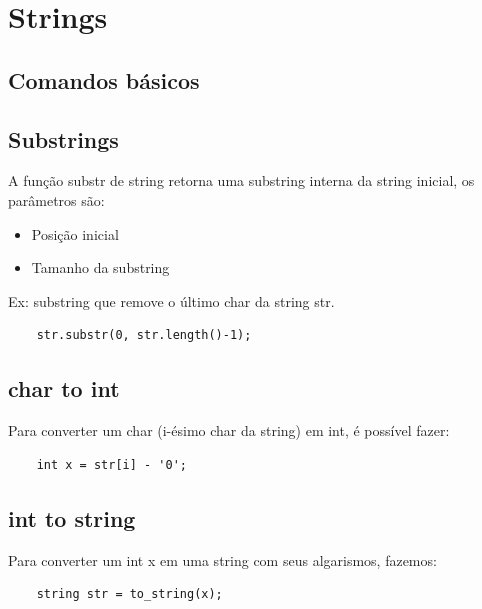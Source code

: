 \section{Strings}

\subsection{Comandos básicos}

\subsection{Substrings}

\par A função substr de string retorna uma substring interna da string inicial, os parâmetros são:
\begin{itemize}
    \item Posição inicial
    \item Tamanho da substring
\end{itemize}
\par Ex: substring que remove o último char da string str.
\begin{verbatim}
    str.substr(0, str.length()-1);
\end{verbatim}

\subsection{char to int}
\par Para converter um char (i-ésimo char da string) em int, é possível fazer:
\begin{verbatim}
    int x = str[i] - '0';
\end{verbatim}

\subsection{int to string}
\par Para converter um int x em uma string com seus algarismos, fazemos:
\begin{verbatim}
    string str = to_string(x);
\end{verbatim}

